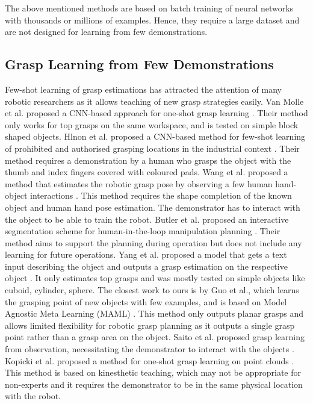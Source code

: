 \documentclass[letterpaper]{article} %
\begin{document}
The above mentioned methods are based on batch training of neural networks with thousands or millions of examples. Hence, they require a large dataset and are not designed for learning from few demonstrations.

\subsection{Grasp Learning from Few Demonstrations}

Few-shot learning of grasp estimations has attracted the attention of many robotic researchers as it allows teaching of new grasp strategies easily. Van Molle et al. proposed a CNN-based approach for one-shot grasp learning \cite{van2018learning}. Their method only works for top grasps on the same workspace, and is tested on simple block shaped objects. Hlnon et al. proposed a CNN-based method for few-shot learning of prohibited and authorised grasping locations in the industrial context \cite{helenon2020learning}. Their method requires a demonstration by a human who grasps the object with the thumb and index fingers covered with coloured pads.
Wang et al. proposed a method that estimates the robotic grasp pose by observing a few human hand-object interactions \cite{wang2021demograsp}. This method requires the shape completion of the known object and human hand pose estimation. The demonstrator has to interact with the object to be able to train the robot. Butler et al. proposed an interactive segmentation scheme for human-in-the-loop manipulation planning \cite{butler2017interactive}. Their method aims to support the planning during operation but does not include any learning for future operations. Yang et al. proposed a model that gets a text input describing the object and outputs a grasp estimation on the respective object \cite{yang2021attribute}. It only estimates top grasps and was mostly tested on simple objects like cuboid, cylinder, sphere. The closest work to ours is by Guo et al., which learns the grasping point of new objects with few examples, and is based on Model Agnostic Meta Learning (MAML)  \cite{guo2022few}. This method only outputs planar grasps and allows limited flexibility for robotic grasp planning as it outputs a single grasp point rather than a grasp area on the object. Saito et al. proposed grasp learning from observation, necessitating the demonstrator to interact with the objects \cite{saito2022task}. Kopicki et al. proposed a method for one-shot grasp learning on point clouds  \cite{kopicki2016one}. This method is based on kinesthetic teaching, which may not be appropriate for non-experts and it requires the demonstrator to be in the same physical location with the robot.
\end{document}
